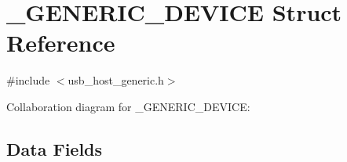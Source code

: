 \hypertarget{struct___g_e_n_e_r_i_c___d_e_v_i_c_e}{}\section{\+\_\+\+G\+E\+N\+E\+R\+I\+C\+\_\+\+D\+E\+V\+I\+C\+E Struct Reference}
\label{struct___g_e_n_e_r_i_c___d_e_v_i_c_e}


{\ttfamily \#include $<$usb\+\_\+host\+\_\+generic.\+h$>$}



Collaboration diagram for \+\_\+\+G\+E\+N\+E\+R\+I\+C\+\_\+\+D\+E\+V\+I\+C\+E\+:
\subsection*{Data Fields}

